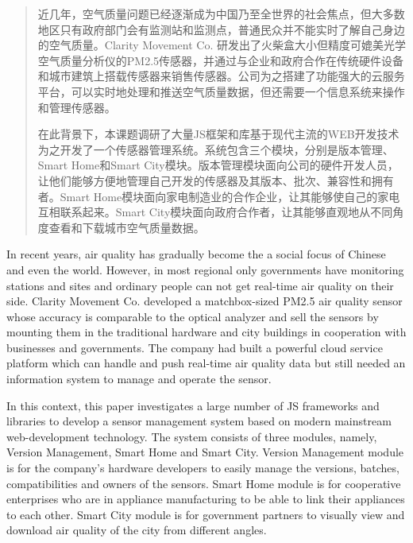 
\begin{abstract}

近几年，空气质量问题已经逐渐成为中国乃至全世界的社会焦点，但大多数地区只有政府部门会有监测站和监测点，普通民众并不能实时了解自己身边的空气质量。Clarity Movement Co. 研发出了火柴盒大小但精度可媲美光学空气质量分析仪的PM2.5传感器，并通过与企业和政府合作在传统硬件设备和城市建筑上搭载传感器来销售传感器。公司为之搭建了功能强大的云服务平台，可以实时地处理和推送空气质量数据，但还需要一个信息系统来操作和管理传感器。

在此背景下，本课题调研了大量JS框架和库基于现代主流的WEB开发技术为之开发了一个传感器管理系统。系统包含三个模块，分别是版本管理、Smart Home和Smart City模块。版本管理模块面向公司的硬件开发人员，让他们能够方便地管理自己开发的传感器及其版本、批次、兼容性和拥有者。Smart Home模块面向家电制造业的合作企业，让其能够使自己的家电互相联系起来。Smart City模块面向政府合作者，让其能够直观地从不同角度查看和下载城市空气质量数据。

\end{abstract}

\begin{englishabstract}

In recent years, air quality has gradually become the a social focus of Chinese and even the world. However, in most regional only governments have monitoring stations and sites and ordinary people can not get real-time air quality on their side. Clarity Movement Co. developed a matchbox-sized PM2.5 air quality sensor whose accuracy is comparable to the optical analyzer and sell the sensors by mounting them in the traditional hardware and city buildings in cooperation with businesses and governments. The company had built a powerful cloud service platform which can handle and push real-time air quality data but still needed an information system to manage and operate the sensor.

In this context, this paper investigates a large number of JS frameworks and libraries to develop a sensor management system based on modern mainstream web-development technology. The system consists of three modules, namely, Version Management, Smart Home and Smart City. Version Management module is for the company's hardware developers to easily manage the versions, batches, compatibilities and owners of the sensors. Smart Home module is for cooperative enterprises who are in appliance manufacturing to be able to link their appliances to each other. Smart City module is for government partners to visually view and download air quality of the city from different angles.

\end{englishabstract}

